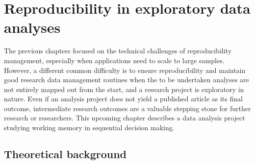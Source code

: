 

\chapter{Reproducibility in exploratory data analyses}
\label{k5}

The previous chapters focused on the technical challenges of reproducibility management, especially when applications need to scale to large samples.
However, a different common difficulty is to ensure reproducibility and maintain good research data management routines when the to be undertaken analyses are not entirely mapped out from the start, and a research project is exploratory in nature.
Even if an analysis project does not yield a published article as its final outcome, intermediate research outcomes are a valuable stepping stone for further research or researchers.
This upcoming chapter describes a data analysis project studying working memory in sequential decision making.

\section{Theoretical background}

